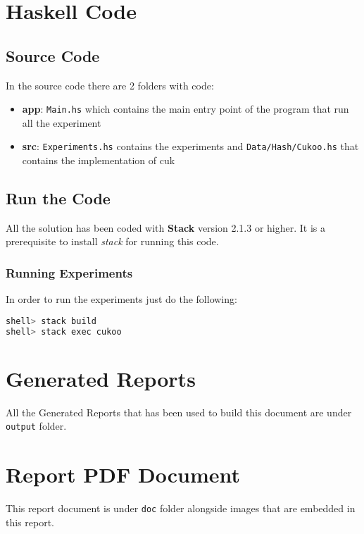 \documentclass[12pt, a4paper]{article}
\begin{document}
\appendix\label{appendix}
\section{Haskell Code}
\subsection{Source Code}
In the source code there are 2 folders with code:

\begin{itemize}
  \item \textbf{app}: \texttt{Main.hs} which contains the main entry point of the program that run all the experiment
  \item \textbf{src}: \texttt{Experiments.hs} contains the experiments and \texttt{Data/Hash/Cukoo.hs} that contains the implementation of \acrshort{cuk}
\end{itemize}

\subsection{Run the Code}
All the solution has been coded with \textbf{Stack} \cite{stack} version 2.1.3 or higher. It is a prerequisite to install \textit{stack} for running this code.

\subsubsection{Running Experiments}

In order to run the experiments just do the following:

\begin{lstlisting}[language=Haskell,title={Running Experiments}]
shell> stack build
shell> stack exec cukoo
\end{lstlisting}

\section{Generated Reports}
All the Generated Reports that has been used to build this document are under \texttt{output} folder.


\section{Report PDF Document}
This report document is under \texttt{doc} folder alongside images that are embedded in this report.





\printglossary[type=\acronymtype]
\end{document}
